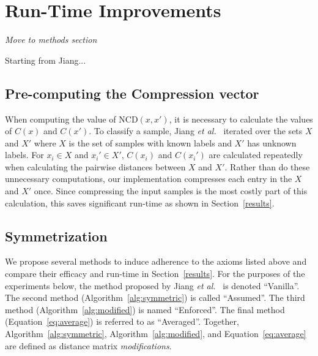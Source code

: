 \documentclass[preprint,12pt]{article}
\newcommand{\cm}[1]{\textit{{\color{blue}#1}}}
\begin{document}
\section{Run-Time Improvements}
\cm{Move to methods section}
\label{improvements}


Starting from Jiang...


\subsection{Pre-computing the Compression vector}
\label{pre_compute_compression}

When computing the value of NCD$(x,x')$, it is necessary to calculate the values of $C(x)$ and $C(x')$. 
To classify a sample, Jiang \textit{et al.}~\cite{jiang2022less} iterated over the sets $X$ and $X'$ where $X$ is the set of samples with known labels and $X'$ has unknown labels. 
For $x_i \in X$ and $x_i' \in X'$, $C(x_i)$ and $C(x_i')$ are calculated repeatedly when calculating the pairwise distances between $X$ and $X'$.
Rather than do these unnecessary computations, our implementation compresses each entry in the $X$ and $X'$ once. 
Since compressing the input samples is the most costly part of this calculation, this saves significant run-time as shown in Section~\ref{results}.



\subsection{Symmetrization}
\label{modifications}

We propose several methods to induce adherence to the axioms listed above and compare their efficacy and run-time in Section~\ref{results}.
For the purposes of the experiments below, the method proposed by Jiang \textit{et al.}~\cite{jiang2022less} is denoted ``Vanilla''. 
The second method (Algorithm~\ref{alg:symmetric}) is called ``Assumed''. 
The third method (Algorithm~\ref{alg:modified}) is named ``Enforced''. 
The final method (Equation~\ref{eq:average}) is referred to as ``Averaged''. 
Together, Algorithm~\ref{alg:symmetric}, Algorithm~\ref{alg:modified}, and Equation~\ref{eq:average} are defined as distance matrix \textit{modifications}. 
\end{document}
